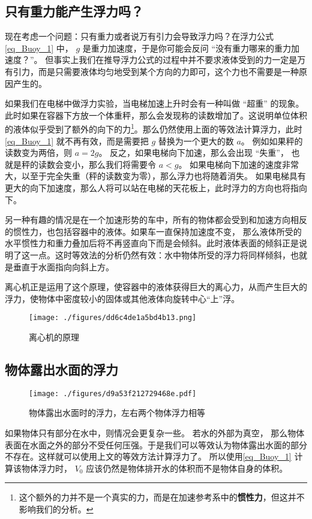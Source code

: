 \subsection{只有重力能产生浮力吗？}
现在考虑一个问题：只有重力或者说万有引力会导致浮力吗？在浮力公式\autoref{eq_Buoy_1} 中， $g$ 是重力加速度，于是你可能会反问 “没有重力哪来的重力加速度？”。 但事实上我们在推导浮力公式的过程中并不要求液体受到的力一定是万有引力，而是只需要液体均匀地受到某个方向的力即可，这个力也不需要是一种原因产生的。

如果我们在电梯中做浮力实验，当电梯加速上升时会有一种叫做 “超重” 的现象。 此时如果在容器下方放一个体重秤，那么会发现称的读数增加了。这说明单位体积的液体似乎受到了额外的向下的力\footnote{这个额外的力并不是一个真实的力，而是在加速参考系中的\textbf{惯性力}，但这并不影响我们的分析。}。那么仍然使用上面的等效法计算浮力，此时\autoref{eq_Buoy_1} 就不再有效，而是需要把 $g$ 替换为一个更大的数 $a$。 例如如果秤的读数变为两倍，则 $a = 2g$。 反之，如果电梯向下加速，那么会出现 “失重”， 也就是秤的读数会变小，那么我们将需要令 $a < g$。 如果电梯向下加速的速度非常大，以至于完全失重（秤的读数变为零），那么浮力也将随着消失。 如果电梯具有更大的向下加速度，那么人将可以站在电梯的天花板上，此时浮力的方向也将指向下。

另一种有趣的情况是在一个加速形势的车中，所有的物体都会受到和加速方向相反的惯性力，也包括容器中的液体。如果车一直保持加速度不变， 那么液体所受的水平惯性力和重力叠加后将不再竖直向下而是会倾斜。此时液体表面的倾斜正是说明了这一点。这时等效法的分析仍然有效：水中物体所受的浮力将同样倾斜，也就是垂直于水面指向向斜上方。

离心机正是运用了这个原理，使容器中的液体获得巨大的离心力，从而产生巨大的浮力，使物体中密度较小的固体或其他液体向旋转中心“上”浮。
\begin{figure}[ht]
\centering
\texttt{[image: ./figures/dd6c4de1a5bd4b13.png]}
\caption{离心机的原理} \label{fig_Buoy_3}
\end{figure}

\subsection{物体露出水面的浮力}
\begin{figure}[ht]
\centering
\texttt{[image: ./figures/d9a53f212729468e.pdf]}
\caption{物体露出水面时的浮力，左右两个物体浮力相等} \label{fig_Buoy_2}
\end{figure}
如果物体只有部分在水中，则情况会更复杂一些。 若水的外部为真空， 那么物体表面在水面之外的部分不受任何压强。于是我们可以等效认为物体露出水面的部分不存在。这样就可以使用上文的等效方法计算浮力了。 所以使用\autoref{eq_Buoy_1} 计算该物体浮力时， $V_0$ 应该仍然是物体排开水的体积而不是物体自身的体积。

